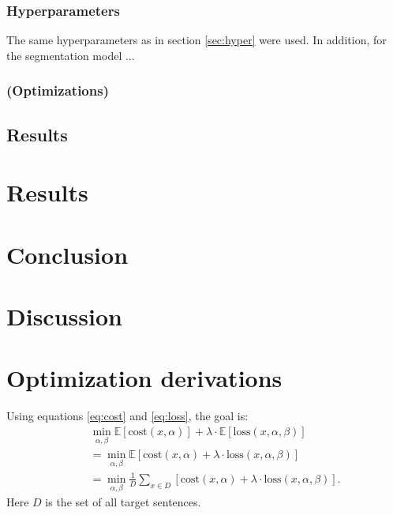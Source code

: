 \documentclass[a4paper, 12pt]{report}
\begin{document}
\subsection{Hyperparameters}
The same hyperparameters as in section \ref{sec:hyper} were used.
In addition, for the segmentation model ...

\subsection{(Optimizations)}

\section{Results}

\chapter{Results}

\chapter{Conclusion}

\chapter{Discussion}




\appendix
\chapter{Optimization derivations}
\label{app:gradients}
Using equations \ref{eq:cost} and \ref{eq:loss}, the goal is:
\begin{align*}
    \quad & \min_{\alpha, \beta} \mathbb{E} [\text{cost}(x, \alpha)] + \lambda \cdot \mathbb{E}[\text{loss}(x, \alpha, \beta)] \\
    &= \min_{\alpha, \beta} \mathbb{E} [\text{cost}(x, \alpha) + \lambda \cdot \text{loss}(x, \alpha, \beta)] \\
    &= \min_{\alpha, \beta} \frac{1}{D} \sum_{x \in D}[\text{cost}(x, \alpha) + \lambda \cdot \text{loss}(x, \alpha, \beta)].
\end{align*}
Here $D$ is the set of all target sentences. \\
\end{document}
